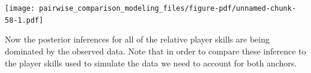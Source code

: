 \documentclass[
  letterpaper,
  DIV=11,
  numbers=noendperiod]{scrartcl}
\newenvironment{Shaded}{\begin{snugshade}}{\end{snugshade}}
\newcommand{\AttributeTok}[1]{\textcolor[rgb]{0.40,0.45,0.13}{#1}}
\newcommand{\ConstantTok}[1]{\textcolor[rgb]{0.56,0.35,0.01}{#1}}
\newcommand{\ControlFlowTok}[1]{\textcolor[rgb]{0.00,0.23,0.31}{#1}}
\newcommand{\DecValTok}[1]{\textcolor[rgb]{0.68,0.00,0.00}{#1}}
\newcommand{\FunctionTok}[1]{\textcolor[rgb]{0.28,0.35,0.67}{#1}}
\newcommand{\NormalTok}[1]{\textcolor[rgb]{0.00,0.23,0.31}{#1}}
\newcommand{\OtherTok}[1]{\textcolor[rgb]{0.00,0.23,0.31}{#1}}
\newcommand{\SpecialCharTok}[1]{\textcolor[rgb]{0.37,0.37,0.37}{#1}}
\begin{document}
\texttt{[image: pairwise\_comparison\_modeling\_files/figure-pdf/unnamed-chunk-58-1.pdf]}

Now the posterior inferences for all of the relative player skills are
being dominated by the observed data. Note that in order to compare
these inference to the player skills used to simulate the data we need
to account for both anchors.

\begin{Shaded}
\end{Shaded}
\end{document}
